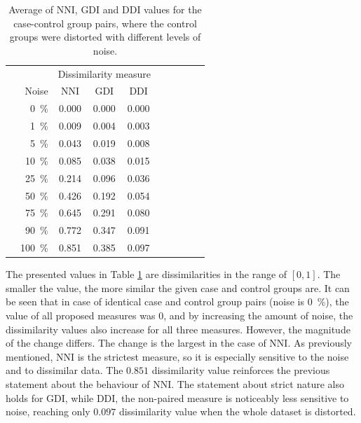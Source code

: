 	\begin{table}[h]
		\centering
		\caption{Average of NNI, GDI and DDI values for the case-control group pairs, where the control groups were distorted with different levels of noise.}\label{tab:result1}
		\bgroup
		\def\arraystretch{1.4}
		\begin{tabular}{cr|cccccccc} \toprule
			& & \multicolumn{3}{c}{Dissimilarity measure} \\
			                                               & Noise              & NNI   & GDI   & DDI   \\ \bottomrule
			\multirow{9}{*}{\rotatebox{90}{Noisy control}} & \SI{0}{\percent}   & 0.000 & 0.000 & 0.000 \\
			                                               & \SI{1}{\percent}   & 0.009 & 0.004 & 0.003 \\
			                                               & \SI{5}{\percent}   & 0.043 & 0.019 & 0.008 \\
			                                               & \SI{10}{\percent}  & 0.085 & 0.038 & 0.015 \\
			                                               & \SI{25}{\percent}  & 0.214 & 0.096 & 0.036 \\
			                                               & \SI{50}{\percent}  & 0.426 & 0.192 & 0.054 \\
			                                               & \SI{75}{\percent}  & 0.645 & 0.291 & 0.080 \\
			                                               & \SI{90}{\percent}  & 0.772 & 0.347 & 0.091 \\
			                                               & \SI{100}{\percent} & 0.851 & 0.385 & 0.097 \\ \bottomrule
		\end{tabular}
		\egroup
	\end{table}
					
	The presented values in Table \ref{tab:result1} are dissimilarities in the range of $[0,1]$. The smaller the value, the more similar the given case and control groups are. It can be seen that in case of identical case and control group pairs (noise is \SI{0}{\percent}), the value of all proposed measures was 0, and by increasing the amount of noise, the dissimilarity values also increase for all three measures. However, the magnitude of the change differs. The change is the largest in the case of NNI. As previously mentioned, NNI is the strictest measure, so it is especially sensitive to the noise and to dissimilar data. The $0.851$ dissimilarity value reinforces the previous statement about the behaviour of NNI. The statement about strict nature also holds for GDI, while DDI, the non-paired measure is noticeably less sensitive to noise, reaching only $0.097$ dissimilarity value when the whole dataset is distorted.
	
